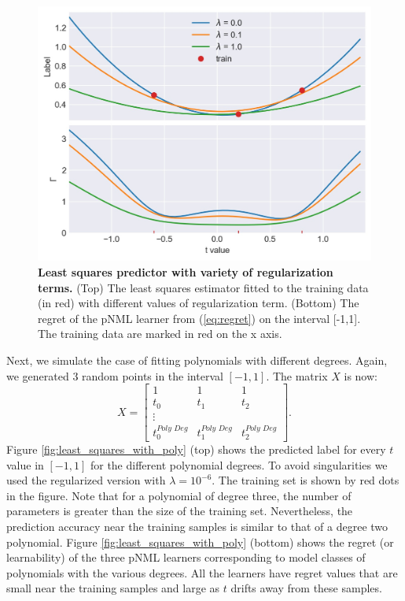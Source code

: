 \documentclass[conference,letterpaper]{IEEEtran}
\begin{document}
\begin{figure}[tb] 
    \centering
    \includegraphics[width=\linewidth]{least_squares_with_regularization.jpg}
    \caption{\textbf{Least squares predictor with variety of regularization terms.} (Top) The least squares estimator fitted to the training data (in red) with different values of regularization term. (Bottom) The regret of the pNML learner from (\ref{eq:regret}) on the interval [-1,1]. The training data are marked in red on the x axis.}
    \label{fig:least_squares_with_reg}
\end{figure}

Next, we simulate the case of fitting polynomials with different degrees. 
Again, we generated 3 random points in the interval $[-1, 1]$.
The matrix $X$ is now:
\begin{equation}
X = 
\begin{bmatrix}
1 & 1 & 1 \\
t_0 & t_1 & t_2 \\
\vdots \\
t_0^{\textit{Poly Deg}} & t_1^{\textit{Poly Deg}} & t_2^{\textit{Poly Deg}} 
\end{bmatrix}.
\end{equation}
Figure \ref{fig:least_squares_with_poly} (top) shows the predicted label for every $t$ value in $[-1,1]$ for the different polynomial degrees. 
To avoid singularities we used the regularized version with $\lambda=10^{-6}$. 
The training set is shown by red dots in the figure. 
Note that for a polynomial of degree three, the number of parameters is greater than the size of the training set. 
Nevertheless, the prediction accuracy near the training samples is similar to that of a degree two polynomial.
Figure \ref{fig:least_squares_with_poly} (bottom) shows the regret (or learnability) of the three pNML learners corresponding to model classes of polynomials with the various degrees. 
All the learners have regret values that are small near the training samples and large as $t$ drifts away from these samples.
\end{document}
